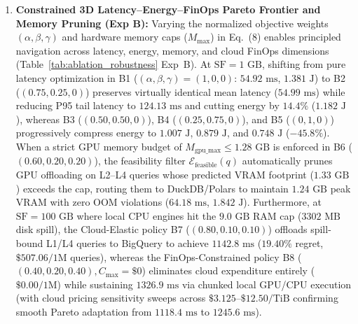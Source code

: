 \documentclass[10pt,a4paper]{article}
\begin{document}
\begin{enumerate}[leftmargin=1.5em,itemsep=0.8pt]
regret, $p=0.0068$) all fail to match $\text{CSCI}(q)$ ($\mathbf{4.91}$ splits/tree [$\mathbf{-28.22\%}$], $\mathbf{54.92\text{ ms}}$, $\mathbf{114.11\%}$ P95 regret) because PCA maximizes syntactic operator variance ($D, N$) rather than memory-pass cost scaling, and zero-shot external transfer on \textbf{Official TPC-DS 99Q} and \textbf{ClickBench 43Q} confirms that canonical $\text{CSCI}(q)$ ($\mathbf{64.65\%}$ Top-1 [$3.23\%$ regret] and $\mathbf{88.37\%}$ Top-1) substantially outperforms $\text{PCA}_1$ ($59.60\%$ [$8.92\%$ regret] and $81.40\%$), Random Oblique ($58.59\%$ and $79.07\%$), and Equal-Weight $\mathbf{w}_{\text{eq}}=[1..1]$ ($61.62\%$ and $83.72\%$, $p=0.0284$).
    \item \textbf{Constrained 3D Latency--Energy--FinOps Pareto Frontier and Memory Pruning (Exp B):} Varying the normalized objective weights $(\alpha, \beta, \gamma)$ and hardware memory caps ($M_{\max}$) in Eq.~(8) enables principled navigation across latency, energy, memory, and cloud FinOps dimensions (Table~\ref{tab:ablation_robustness} Exp~B). At $\text{SF}=1\text{ GB}$, shifting from pure latency optimization in B1 ($(\alpha,\beta,\gamma)=(1,0,0)$: $54.92\text{ ms}$, $1.381\text{ J}$) to B2 ($(0.75, 0.25, 0)$) preserves virtually identical mean latency ($54.99\text{ ms}$) while reducing P95 tail latency to $124.13\text{ ms}$ and cutting energy by $14.4\%$ ($1.182\text{ J}$), whereas B3 ($(0.50, 0.50, 0)$), B4 ($(0.25, 0.75, 0)$), and B5 ($(0, 1, 0)$) progressively compress energy to $1.007\text{ J}$, $0.879\text{ J}$, and $0.748\text{ J}$ ($-45.8\%$). When a strict GPU memory budget of $M_{\text{gpu\_max}} \le 1.28\text{ GB}$ is enforced in B6 ($(0.60, 0.20, 0.20)$), the feasibility filter $\mathcal{E}_{\text{feasible}}(q)$ automatically prunes GPU offloading on L2--L4 queries whose predicted VRAM footprint ($1.33\text{ GB}$) exceeds the cap, routing them to DuckDB/Polars to maintain $1.24\text{ GB}$ peak VRAM with zero OOM violations ($64.18\text{ ms}$, $1.842\text{ J}$). Furthermore, at $\text{SF}=100\text{ GB}$ where local CPU engines hit the $9.0\text{ GB}$ RAM cap ($3302\text{ MB}$ disk spill), the Cloud-Elastic policy B7 ($(0.80, 0.10, 0.10)$) offloads spill-bound L1/L4 queries to BigQuery to achieve $1142.8\text{ ms}$ ($19.40\%$ regret, $\$507.06/1\text{M}$ queries), whereas the FinOps-Constrained policy B8 ($(0.40, 0.20, 0.40), C_{\max}=\$0$) eliminates cloud expenditure entirely ($\$0.00/1\text{M}$) while sustaining $1326.9\text{ ms}$ via chunked local GPU/CPU execution (with cloud pricing sensitivity sweeps across $\$3.125\text{--}\$12.50\text{/TiB}$ confirming smooth Pareto adaptation from $1118.4\text{ ms}$ to $1245.6\text{ ms}$). 

\end{enumerate}
\end{document}
